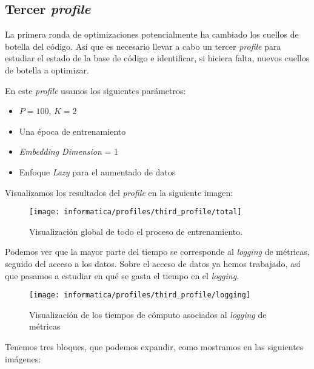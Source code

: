 \subsection{Tercer \textit{profile}}

La primera ronda de optimizaciones potencialmente ha cambiado los cuellos de botella del código. Así que es necesario llevar a cabo un tercer \textit{profile} para estudiar el estado de la base de código e identificar, si hiciera falta, nuevos cuellos de botella a optimizar.

En este \textit{profile} usamos los siguientes parámetros:

\begin{itemize}
    \item $P = 100$, $K = 2$
    \item Una época de entrenamiento
    \item \textit{Embedding Dimension} = 1
    \item Enfoque \textit{Lazy} para el aumentado de datos
\end{itemize}

Visualizamos los resultados del \textit{profile} en la siguiente imagen:

\begin{figure}[H]
    \centering
    \texttt{[image: informatica/profiles/third\_profile/total]}
    \caption{Visualización global de todo el proceso de entrenamiento.}
\end{figure}

Podemos ver que la mayor parte del tiempo se corresponde al \textit{logging} de métricas, seguido del acceso a los datos. Sobre el acceso de datos ya hemos trabajado, así que pasamos a estudiar en qué se gasta el tiempo en el \textit{logging}.


\begin{figure}[H]
    \centering
    \texttt{[image: informatica/profiles/third\_profile/logging]}
    \caption{Visualización de los tiempos de cómputo asociados al \textit{logging} de métricas}
\end{figure}

Tenemos tres bloques, que podemos expandir, como mostramos en las siguientes imágenes:

